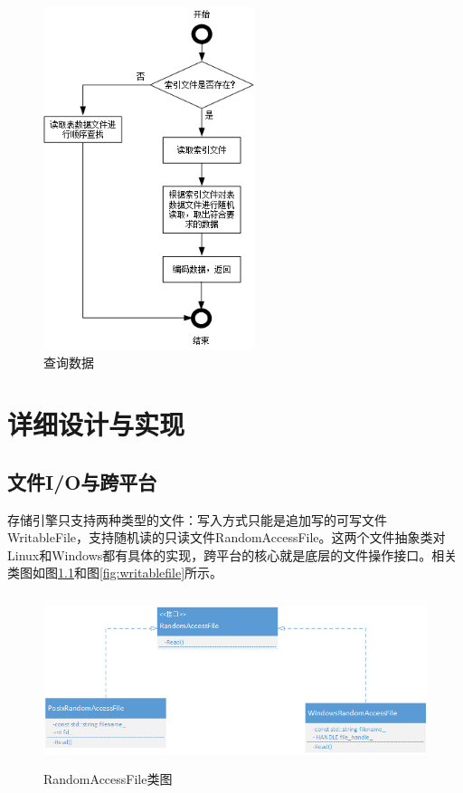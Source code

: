 \documentclass[bachelor]{thesis-uestc}
\begin{document}
\begin{figure}[htbp]
	\centering\includegraphics[height=10cm]{images/lookup.png}
	\caption{查询数据}
	\label{fig:lookup}
\end{figure}

\chapter{详细设计与实现}
\section{文件I/O与跨平台}
存储引擎只支持两种类型的文件：写入方式只能是追加写的可写文件WritableFile，支持随机读的只读文件RandomAccessFile。这两个文件抽象类对Linux和Windows都有具体的实现，跨平台的核心就是底层的文件操作接口。相关类图如图\ref{fig:randonaccessfile}和图\ref{fig:writablefile}所示。

\begin{figure}[htbp]
	\centering\includegraphics[height=5cm]{images/randomaccessfile.png}
	\caption{RandomAccessFile类图}
	\label{fig:randonaccessfile}
\end{figure}
\end{document}
